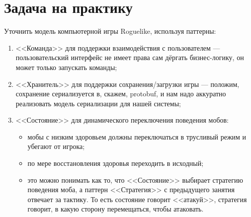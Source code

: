 \documentclass{../../text-style}
\begin{document}
\section{Задача на практику}

Уточнить модель компьютерной игры Roguelike, используя паттерны:

\begin{enumerate}
    \item <<Команда>> для поддержки взаимодействия с пользователем --- пользовательский интерфейс не имеет права сам дёргать бизнес-логику, он может только запускать команды;
    \item <<Хранитель>> для поддержки сохранения/загрузки игры --- положим, сохранение сериализуется в, скажем, protobuf, и нам надо аккуратно реализовать модель сериализации для нашей системы;
    \item <<Состояние>> для динамического переключения поведения мобов:
    \begin{itemize}
        \item мобы с низким здоровьем должны переключаться в трусливый режим и убегают от игрока;
        \item по мере восстановления здоровья переходить в исходный;
        \item это можно понимать как то, что <<Состояние>> выбирает стратегию поведения моба, а паттерн <<Стратегия>> с предыдущего занятия отвечает за тактику. То есть состояние говорит <<атакуй>>, стратегия говорит, в какую сторону перемещаться, чтобы атаковать.
    \end{itemize}
\end{enumerate}
\end{document}
